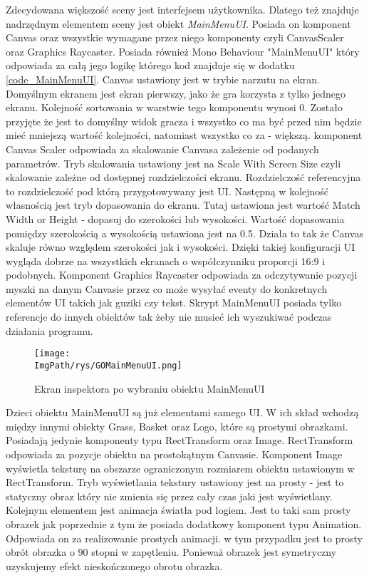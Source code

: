 \documentclass[a4paper,12pt,twoside,openany]{report}
\newcommand{\ImgPath}{.}
\begin{document}
Zdecydowana większość sceny jest interfejsem użytkownika. Dlatego też znajduje nadrzędnym elementem sceny jest obiekt \textit{MainMenuUI}. Posiada on komponent Canvas oraz wszystkie wymagane przez niego komponenty czyli CanvasScaler oraz Graphics Raycaster. Posiada również Mono Behaviour "MainMenuUI"  który odpowiada za całą jego logikę którego kod znajduje się w dodatku \ref{code_MainMenuUI}. Canvas ustawiony jest w trybie narzutu na ekran. Domyślnym ekranem jest ekran pierwszy, jako że gra korzysta z tylko jednego ekranu. Kolejność sortowania w warstwie tego komponentu wynosi 0. Zostało przyjęte że jest to domyślny widok gracza i wszystko co ma być przed nim będzie mieć mniejszą wartość kolejności, natomiast wszystko co za  - większą. komponent Canvas Scaler odpowiada za skalowanie Canvasa zależenie od podanych parametrów. Tryb skalowania ustawiony jest na Scale With Screen Size czyli skalowanie zależne od dostępnej rozdzielczości ekranu. Rozdzielczość referencyjna to rozdzielczość pod którą przygotowywany jest UI. Następną w kolejność własnością jest tryb dopasowania do ekranu. Tutaj ustawiona jest wartość Match Width or Height - dopasuj do szerokości lub wysokości. Wartość dopasowania pomiędzy szerokością a wysokością ustawiona jest na 0.5. Działa to tak że Canvas skaluje równo względem szerokości jak i wysokości. Dzięki takiej konfiguracji UI wygląda dobrze na wszystkich ekranach o współczynniku proporcji 16:9 i podobnych. Komponent Graphics Raycaster odpowiada za odczytywanie pozycji myszki na danym Canvasie przez co może wysyłać eventy do konkretnych elementów UI takich jak guziki czy tekst. Skrypt MainMenuUI posiada tylko referencje do innych obiektów tak żeby nie musieć ich wyszukiwać podczas działania programu. 

\begin{figure}[H]
	\begin{center}
\centering
\texttt{[image: \\ImgPath/rys/GOMainMenuUI.png]}
\end{center}
	\caption{Ekran inspektora po wybraniu obiektu MainMenuUI}
	\label{GOMainMenuUI}
\end{figure}

Dzieci obiektu MainMenuUI są już elementami samego UI. W ich skład wchodzą między innymi obiekty Grass, Basket oraz Logo, które są prostymi obrazkami. Posiadają jedynie komponenty typu RectTransform oraz Image. RectTransform odpowiada za pozycje obiektu na prostokątnym Canvasie. Komponent Image wyświetla teksturę na obszarze ograniczonym rozmiarem obiektu ustawionym w RectTransform. Tryb wyświetlania tekstury ustawiony jest na prosty - jest to statyczny obraz który nie zmienia się przez cały czas jaki jest wyświetlany. Kolejnym elementem jest animacja światła pod logiem. Jest to taki sam prosty obrazek jak poprzednie z tym że posiada dodatkowy komponent typu Animation. Odpowiada on za realizowanie prostych animacji. w tym przypadku jest to prosty obrót obrazka o 90 stopni w zapętleniu. Ponieważ obrazek jest symetryczny uzyskujemy efekt nieskończonego obrotu obrazka.
\end{document}
